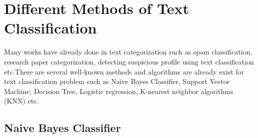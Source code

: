 \section{Different Methods of Text Classification}
Many works have already done in text categorization such as spam classification, research paper categorization, detecting suspicious profile using text classification etc.There are several well-known methods and algorithms are already exist for text classification problem such as Naïve Bayes Classifier, Support Vector Machine, Decision Tree, Logistic regression, K-nearest neighbor algorithms (KNN) etc.

\subsection{Naive Bayes Classifier}

